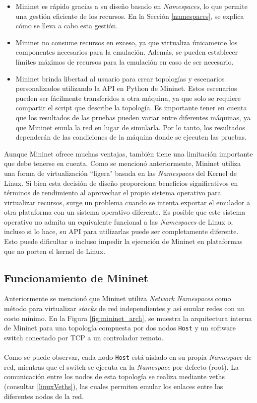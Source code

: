 \begin{itemize}
    \item Mininet es rápido gracias a su diseño basado en \textit{Namespaces}, lo que permite una gestión eficiente de los recursos. En la Sección \ref{namespaces}, se explica cómo se lleva a cabo esta gestión.
    \item Mininet no consume recursos en exceso, ya que virtualiza únicamente los componentes necesarios para la emulación. Además, se pueden establecer límites máximos de recursos para la emulación en caso de ser necesario.
    \item Mininet brinda libertad al usuario para crear topologías y escenarios personalizados utilizando la API en Python de Mininet. Estos escenarios pueden ser fácilmente transferidos a otra máquina, ya que solo se requiere compartir el script que describe la topología. Es importante tener en cuenta que los resultados de las pruebas pueden variar entre diferentes máquinas, ya que Mininet emula la red en lugar de simularla. Por lo tanto, los resultados dependerán de las condiciones de la máquina donde se ejecuten las pruebas.
\end{itemize}

Aunque Mininet ofrece muchas ventajas, también tiene una limitación importante que debe tenerse en cuenta. Como se mencionó anteriormente, Mininet utiliza una forma de virtualización ``ligera" basada en las \textit{Namespaces} del Kernel de Linux. Si bien esta decisión de diseño proporciona beneficios significativos en términos de rendimiento al aprovechar el propio sistema operativo para virtualizar recursos, surge un problema cuando se intenta exportar el emulador a otra plataforma con un sistema operativo diferente. Es posible que este sistema operativo no admita un equivalente funcional a las \textit{Namespaces} de Linux o, incluso si lo hace, su API para utilizarlas puede ser completamente diferente. Esto puede dificultar o incluso impedir la ejecución de Mininet en plataformas que no porten el kernel de Linux.


\subsection{Funcionamiento de Mininet}

Anteriormente se mencionó que Mininet utiliza \textit{Network Namespaces} como método para virtualizar \textit{stacks} de red independientes y así emular redes con un costo mínimo. En la Figura \ref{fig:mininet_arch}, se muestra la arquitectura interna de Mininet para una topología compuesta por dos nodos \texttt{Host} y un software switch conectado por TCP a un controlador remoto.\\
\\
Como se puede observar, cada nodo \texttt{Host} está aislado en su propia \textit{Namespace} de red, mientras que el switch se ejecuta en la \textit{Namespace} por defecto (root). La comunicación entre los nodos de esta topología se realiza mediante \gls{veth}s (consultar \ref{linuxVeths}), las cuales permiten emular los enlaces entre los diferentes nodos de la red.\\

